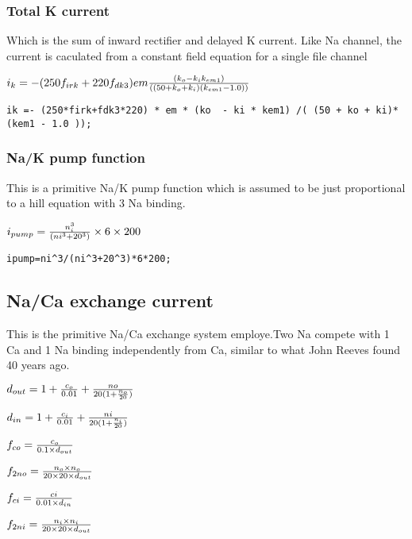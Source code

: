 \documentclass[11pt]{article}
\begin{document}
    \subsubsection{Total K current}\label{total-k-current}

Which is the sum of inward rectifier and delayed K current. Like Na
channel, the current is caculated from a constant field equation for a
single file channel

    \(\large i_k = -(250 f_{irk}+ 220f_{dk3}) em \frac{(k_o-k_ik_{em1})}{((50+k_o+k_i)(k_{em1} - 1.0))}\)

    \texttt{ik\ =-\ (250*firk+fdk3*220)\ *\ em\ *\ (ko\ \ -\ ki\ *\ kem1)\ /(\ (50\ +\ ko\ +\ ki)*(kem1\ -\ 1.0\ ));}

    \subsubsection{Na/K pump function}\label{nak-pump-function}

This is a primitive Na/K pump function which is assumed to be just
proportional to a hill equation with 3 Na binding.

$\large i_{pump} = \frac{n_i^3}{(ni^3+20^3)} \times 6 \times 200 $

    \begin{verbatim}
ipump=ni^3/(ni^3+20^3)*6*200;
\end{verbatim}

    \subsection{Na/Ca exchange current}\label{naca-exchange-current}

This is the primitive Na/Ca exchange system employe.Two Na compete with
1 Ca and 1 Na binding independently from Ca, similar to what John Reeves
found 40 years ago.

    \(\large d_{out} = 1+ \frac{c_o}{0.01}+ \frac{no}{20(1+\frac{n_o}{20})}\)

\(\large d_{in} = 1+ \frac{c_i}{0.01}+ \frac{ni}{20(1+\frac{n_i}{20})}\)

\(\large f_{co} = \frac{c_o}{0.1 \times d_{out}}\)

\(\large f_{2no} = \frac{n_o \times n_o}{20 \times 20 \times d_{out}}\)

\(\large f_{ci} = \frac{ci}{0.01 \times d_{in}}\)

\(\large f_{2ni} = \frac{n_i \times n_i}{20 \times 20 \times d_{out}}\)
\end{document}
